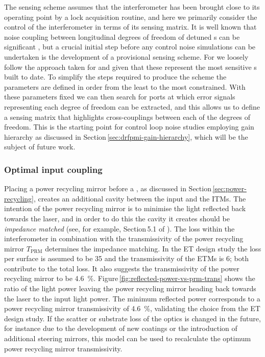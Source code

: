 The sensing scheme assumes that the interferometer has been brought close to its operating point by a lock acquisition routine, and here we primarily consider the control of the interferometer in terms of its sensing matrix. It is well known that noise coupling between longitudinal degrees of freedom of detuned \DRFPMI{}s can be significant \cite{Hild2007}, but a crucial initial step before any control noise simulations can be undertaken is the development of a provisional sensing scheme. For \ETLF{} we loosely follow the approach taken for \ALIGO{} \cite{Abbott2010} and \AVIRGO{} \cite{Vajente2008} given that these represent the most sensitive \DRFPMI{}s built to date. To simplify the steps required to produce the scheme the parameters are defined in order from the least to the most constrained. With these parameters fixed we can then search for ports at which error signals representing each degree of freedom can be extracted, and this allows us to define a sensing matrix that highlights cross-couplings between each of the degrees of freedom. This is the starting point for control loop noise studies employing gain hierarchy as discussed in Section\,\ref{sec:drfpmi-gain-hierarchy}, which will be the subject of future work.

\subsubsection{Optimal input coupling}
Placing a power recycling mirror before a \MI{}, as discussed in Section\,\ref{sec:power-recycling}, creates an additional cavity between the input and the \glspl{ITM}. The intention of the power recycling mirror is to minimise the light reflected back towards the laser, and in order to do this the cavity it creates should be \emph{impedance matched} (see, for example, Section\,5.1 of \cite{Freise2010}). The loss within the interferometer in combination with the transmissivity of the power recycling mirror $T_{\text{PRM}}$ determines the impedance matching. In the \gls{ET} design study the loss per surface is assumed to be \SI{35}{\ppm} and the transmissivity of the \glspl{ETM} is \SI{6}{\ppm}; both contribute to the total loss. It also suggests the transmissivity of the power recycling mirror to be \SI{4.6}{\percent}. Figure\,\ref{fig:reflected-power-vs-prm-trans} shows the ratio of the light power leaving the power recycling mirror heading back towards the laser to the input light power. The minimum reflected power corresponds to a power recycling mirror transmissivity of \SI{4.6}{\percent}, validating the choice from the \gls{ET} design study. If the scatter or substrate loss of the optics is changed in the future, for instance due to the development of new coatings or the introduction of additional steering mirrors, this model can be used to recalculate the optimum power recycling mirror transmissivity.

